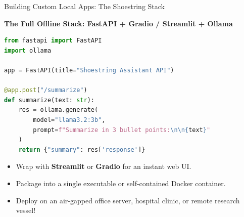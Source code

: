 \documentclass[10pt,aspectratio=169]{beamer}
\begin{document}
\begin{frame}[fragile]{Building Custom Local Apps: The Shoestring Stack}
    \begin{center}
    \textbf{The Full Offline Stack: FastAPI + Gradio / Streamlit + Ollama}
    \end{center}
\begin{lstlisting}[language=Python]
from fastapi import FastAPI
import ollama

app = FastAPI(title="Shoestring Assistant API")

@app.post("/summarize")
def summarize(text: str):
    res = ollama.generate(
        model="llama3.2:3b",
        prompt=f"Summarize in 3 bullet points:\n\n{text}"
    )
    return {"summary": res['response']}
\end{lstlisting}
    \vspace{0.1cm}
    \begin{itemize}
        \item Wrap with \textbf{Streamlit} or \textbf{Gradio} for an instant web UI.
        \item Package into a single executable or self-contained Docker container.
        \item Deploy on an air-gapped office server, hospital clinic, or remote research vessel!
    \end{itemize}
\end{frame}
\end{document}
